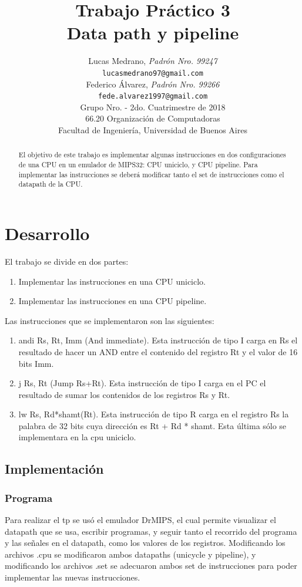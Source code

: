 \documentclass[a4paper, 12pt]{article}
\title{		\textbf{Trabajo Práctico 3}\\
			\textbf{Data path y pipeline}
			}
\author{	Lucas Medrano, \textit{Padrón Nro. 99247}                     	\\
            \texttt{ lucasmedrano97@gmail.com }                           		\\
            Federico Álvarez, \textit{Padrón Nro. 99266}                 	\\
            \texttt{ fede.alvarez1997@gmail.com }                                 	\\[2.5ex]
            \normalsize{Grupo Nro. \quad - 2do. Cuatrimestre de 2018}      	\\
            \normalsize{66.20 Organización de Computadoras}               	\\
            \normalsize{Facultad de Ingeniería, Universidad de Buenos Aires}\\
       }
\date{}
\begin{document}
	\lstset{inputencoding=utf8/latin1} %
	\maketitle
	\thispagestyle{empty}
	\begin{abstract}
		El objetivo de este trabajo es implementar algunas instrucciones en dos configuraciones de una CPU en un emulador de MIPS32: CPU uniciclo, y CPU pipeline.
		Para implementar las instrucciones se deberá modificar tanto el set de instrucciones como el datapath de la CPU.  
	\end{abstract}
			
	\pagebreak
	\thispagestyle{empty}
	\tableofcontents
	\newpage
	
	\setcounter{page}{1}
	
	\section{Desarrollo}
	El trabajo se divide en dos partes:
	\begin{enumerate}
    \item Implementar las instrucciones en una CPU uniciclo.
    \item Implementar las instrucciones en una CPU pipeline.
	\end{enumerate}
	Las instrucciones que se implementaron son las siguientes:
	\begin{enumerate}
    \item andi Rs, Rt, Imm (And immediate). Esta instrucción de tipo I carga en Rs el resultado
de hacer un AND entre el contenido del registro Rt y el valor de 16 bits Imm.
    \item j Rs, Rt (Jump Rs+Rt). Esta instrucción de tipo I carga en el PC el resultado de sumar
los contenidos de los registros Rs y Rt.
	\item lw Rs, Rd*shamt(Rt). Esta instrucción de tipo R carga en el registro Rs la palabra de 32 bits
cuya dirección es Rt + Rd * shamt. Esta última sólo se implementara en la cpu uniciclo.
	\end{enumerate}
	
	\subsection{Implementación}
	\subsubsection{Programa}
	Para realizar el tp se usó el emulador DrMIPS, el cual permite visualizar el datapath que se usa, escribir programas, y seguir tanto el recorrido del programa y las señales en el datapath, como los valores de los registros.
	Modificando los archivos .cpu se modificaron ambos datapaths (unicycle y pipeline), y modificando los archivos .set se adecuaron ambos set de instrucciones para poder implementar las nuevas instrucciones.	
	
\end{document}
